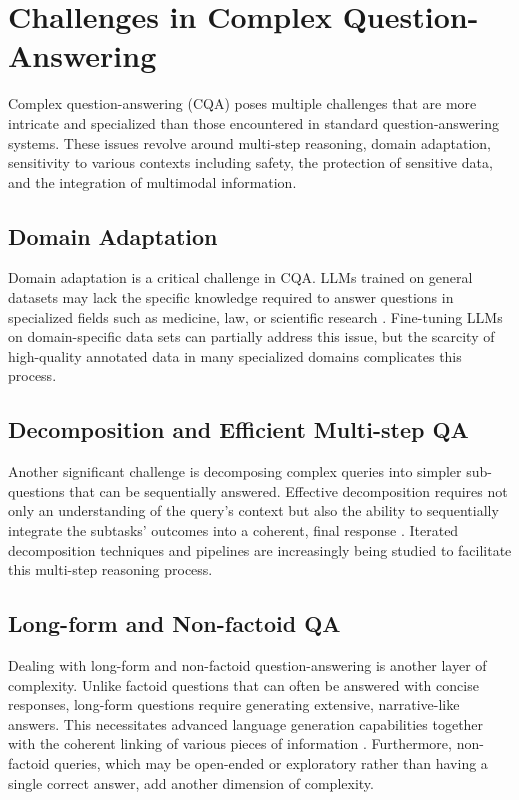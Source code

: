 \documentclass[12pt]{article}
\begin{document}
\section{Challenges in Complex Question-Answering}
Complex question-answering (CQA) poses multiple challenges that are more intricate and specialized than those encountered in standard question-answering systems. These issues revolve around multi-step reasoning, domain adaptation, sensitivity to various contexts including safety, the protection of sensitive data, and the integration of multimodal information. 

\subsection{Domain Adaptation}
Domain adaptation is a critical challenge in CQA. LLMs trained on general datasets may lack the specific knowledge required to answer questions in specialized fields such as medicine, law, or scientific research \cite{journalhupkes}. Fine-tuning LLMs on domain-specific data sets can partially address this issue, but the scarcity of high-quality annotated data in many specialized domains complicates this process.

\subsection{Decomposition and Efficient Multi-step QA}
Another significant challenge is decomposing complex queries into simpler sub-questions that can be sequentially answered. Effective decomposition requires not only an understanding of the query's context but also the ability to sequentially integrate the subtasks' outcomes into a coherent, final response \cite{journalwolf}. Iterated decomposition techniques and pipelines are increasingly being studied to facilitate this multi-step reasoning process.

\subsection{Long-form and Non-factoid QA}
Dealing with long-form and non-factoid question-answering is another layer of complexity. Unlike factoid questions that can often be answered with concise responses, long-form questions require generating extensive, narrative-like answers. This necessitates advanced language generation capabilities together with the coherent linking of various pieces of information \cite{journalfabbri}. Furthermore, non-factoid queries, which may be open-ended or exploratory rather than having a single correct answer, add another dimension of complexity.
\end{document}
